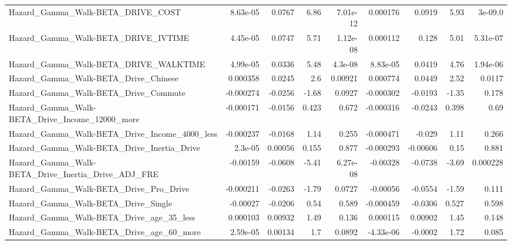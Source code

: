 \begin{tabular}{lrrrrrrrr}
Hazard\_Gamma\_Walk-BETA\_DRIVE\_COST                  &    8.63e-05 &       0.0767 &     6.86 & 7.01e-12 &   0.000176 &      0.0919 &         5.93 &       3e-09.0 \\
Hazard\_Gamma\_Walk-BETA\_DRIVE\_IVTIME                &    4.45e-05 &       0.0747 &     5.71 & 1.12e-08 &   0.000112 &       0.128 &         5.01 &      5.31e-07 \\
Hazard\_Gamma\_Walk-BETA\_DRIVE\_WALKTIME              &    4.99e-05 &       0.0336 &     5.48 &  4.3e-08 &   8.83e-05 &      0.0419 &         4.76 &      1.94e-06 \\
Hazard\_Gamma\_Walk-BETA\_Drive\_Chinese               &    0.000358 &       0.0245 &      2.6 &  0.00921 &   0.000774 &      0.0449 &         2.52 &        0.0117 \\
Hazard\_Gamma\_Walk-BETA\_Drive\_Commute               &   -0.000274 &      -0.0256 &    -1.68 &   0.0927 &  -0.000302 &     -0.0193 &        -1.35 &         0.178 \\
Hazard\_Gamma\_Walk-BETA\_Drive\_Income\_12000\_more     &   -0.000171 &      -0.0156 &    0.423 &    0.672 &  -0.000316 &     -0.0243 &        0.398 &          0.69 \\
Hazard\_Gamma\_Walk-BETA\_Drive\_Income\_4000\_less      &   -0.000237 &      -0.0168 &     1.14 &    0.255 &  -0.000471 &      -0.029 &         1.11 &         0.266 \\
Hazard\_Gamma\_Walk-BETA\_Drive\_Inertia\_Drive         &     2.3e-05 &      0.00056 &    0.155 &    0.877 &  -0.000293 &    -0.00606 &         0.15 &         0.881 \\
Hazard\_Gamma\_Walk-BETA\_Drive\_Inertia\_Drive\_ADJ\_FRE &    -0.00159 &      -0.0608 &    -5.41 & 6.27e-08 &   -0.00328 &     -0.0738 &        -3.69 &      0.000228 \\
Hazard\_Gamma\_Walk-BETA\_Drive\_Pro\_Drive             &   -0.000211 &      -0.0263 &    -1.79 &   0.0727 &   -0.00056 &     -0.0554 &        -1.59 &         0.111 \\
Hazard\_Gamma\_Walk-BETA\_Drive\_Single                &    -0.00027 &      -0.0206 &     0.54 &    0.589 &  -0.000459 &     -0.0306 &        0.527 &         0.598 \\
Hazard\_Gamma\_Walk-BETA\_Drive\_age\_35\_less           &    0.000103 &      0.00932 &     1.49 &    0.136 &   0.000115 &     0.00902 &         1.45 &         0.148 \\
Hazard\_Gamma\_Walk-BETA\_Drive\_age\_60\_more           &    2.59e-05 &      0.00134 &      1.7 &   0.0892 &  -4.33e-06 &     -0.0002 &         1.72 &         0.085 \\

\end{tabular}

